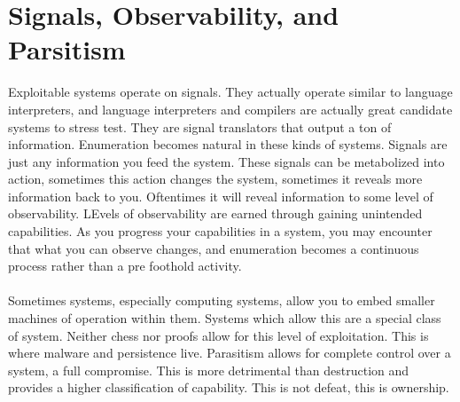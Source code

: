 \documentclass{article}
\begin{document}
	\section{Signals, Observability, and Parsitism}
	Exploitable systems operate on signals. They actually operate similar to language interpreters, and language interpreters and compilers are actually great candidate systems to stress test. They are signal translators that output a ton of information. Enumeration becomes natural in these kinds of systems. Signals are just any information you feed the system. These signals can be metabolized into action, sometimes this action changes the system, sometimes it reveals more information back to you. Oftentimes it will reveal information to some level of observability. LEvels of observability are earned through gaining unintended capabilities. As you progress your capabilities in a system, you may encounter that what you can observe changes, and enumeration becomes a continuous process rather than a pre foothold activity.\\\\
	Sometimes systems, especially computing systems, allow you to embed smaller machines of operation within them. Systems which allow this are a special class of system. Neither chess nor proofs allow for this level of exploitation. This is where malware and persistence live. Parasitism allows for complete control over a system, a full compromise. This is more detrimental than destruction and provides a higher classification of capability. This is not defeat, this is ownership.
\end{document}
